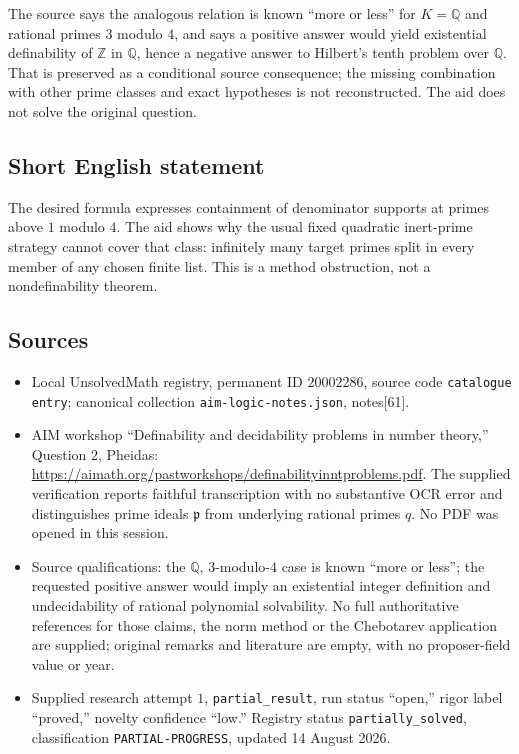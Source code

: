 \documentclass[11pt]{article}
\newcommand{\Z}{\mathbb{Z}}
\newcommand{\Q}{\mathbb{Q}}
\begin{document}
The source says the analogous relation is known ``more or less'' for \(K=\Q\) and rational primes \(3\) modulo \(4\), and says a positive answer would yield existential definability of \(\Z\) in \(\Q\), hence a negative answer to Hilbert's tenth problem over \(\Q\). That is preserved as a conditional source consequence; the missing combination with other prime classes and exact hypotheses is not reconstructed. The aid does not solve the original question.
\subsection{Short English statement}
The desired formula expresses containment of denominator supports at primes above \(1\) modulo \(4\). The aid shows why the usual fixed quadratic inert-prime strategy cannot cover that class: infinitely many target primes split in every member of any chosen finite list. This is a method obstruction, not a nondefinability theorem.
\subsection{Sources}
\begin{itemize}
\item Local UnsolvedMath registry, permanent ID \(20002286\), source code \texttt{catalogue entry}; canonical collection \texttt{aim-logic-notes.json}, notes[61].
\item AIM workshop ``Definability and decidability problems in number theory,'' Question \(2\), Pheidas: \url{https://aimath.org/pastworkshops/definabilityinntproblems.pdf}. The supplied verification reports faithful transcription with no substantive OCR error and distinguishes prime ideals \(\mathfrak p\) from underlying rational primes \(q\). No PDF was opened in this session.
\item Source qualifications: the \(\Q\), \(3\)-modulo-\(4\) case is known ``more or less''; the requested positive answer would imply an existential integer definition and undecidability of rational polynomial solvability. No full authoritative references for those claims, the norm method or the Chebotarev application are supplied; original remarks and literature are empty, with no proposer-field value or year.
\item Supplied research attempt \(1\), \texttt{partial\_result}, run status ``open,'' rigor label ``proved,'' novelty confidence ``low.'' Registry status \texttt{partially\_solved}, classification \texttt{PARTIAL-PROGRESS}, updated 14 August 2026.
\end{itemize}
\end{document}
